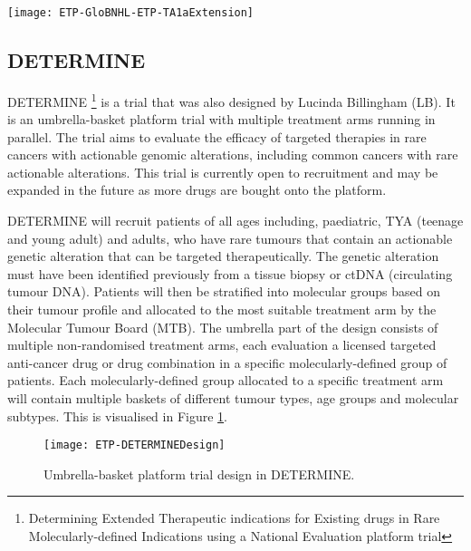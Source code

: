 \begin{sidewaysfigure}[h!]
	\centering
	\caption{ETP for the expansion stage of treatment arm \RN{1}a in Glo-BNHL.}
	\label{fig_etp:GloBNHL-ETP-TA1aExtenstion}
	\texttt{[image: ETP-GloBNHL-ETP-TA1aExtension]}
\end{sidewaysfigure} 

\clearpage



\subsection{DETERMINE}

DETERMINE \footnote{Determining Extended Therapeutic indications for Existing drugs in Rare Molecularly-defined Indications using a National Evaluation platform trial} is a trial that was also designed by Lucinda Billingham (LB). It is an umbrella-basket platform trial with multiple treatment arms running in parallel. The trial aims to evaluate the efficacy of targeted therapies in rare cancers with actionable genomic alterations, including common cancers with rare actionable alterations. This trial is currently open to recruitment and may be expanded in the future as more drugs are bought onto the platform.  

DETERMINE will recruit patients of all ages including, paediatric, TYA (teenage and young adult) and adults, who have rare tumours that contain an actionable genetic alteration that can be targeted therapeutically. The genetic alteration must have been identified previously from a tissue biopsy or ctDNA (circulating tumour DNA). Patients will then be stratified into molecular groups based on their tumour profile and allocated to the most suitable treatment arm by the Molecular Tumour Board (MTB). The umbrella part of the design consists of multiple non-randomised treatment arms, each evaluation a licensed targeted anti-cancer drug or drug combination in a specific molecularly-defined group of patients. Each molecularly-defined group allocated to a specific treatment arm will contain multiple baskets of different tumour types, age groups and molecular subtypes. This is visualised in Figure \ref{fig_etp:DETERMINEDesign}. 

\begin{figure}[h!]
	\centering
	\caption{Umbrella-basket platform trial design in DETERMINE.}
	\label{fig_etp:DETERMINEDesign}
	\texttt{[image: ETP-DETERMINEDesign]}
\end{figure}

